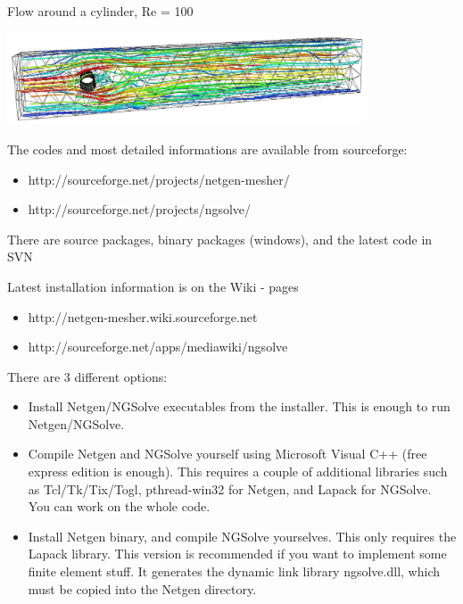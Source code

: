 \documentclass[20pt,landscape,footrule]{foils}
\newcommand\sectionname{}
\begin{document}
\vspace{2em}

Flow around a cylinder, Re = 100 \\[0em] 
%
\begin{minipage}{0.95\textwidth}
\includegraphics[width=0.8\textwidth]{cylinder3dc.jpg}
\end{minipage}



\foilhead{\color{blue}
{\bf Downloading and Installing Netgen/NGSolve  } }
\hypertarget{installing}{}
\renewcommand\sectionname{Installing Netgen/NGSolve}
The codes and most detailed informations are available from sourceforge:

\begin{itemize}
\item http://sourceforge.net/projects/netgen-mesher/
\item http://sourceforge.net/projects/ngsolve/
\end{itemize}

There are source packages, binary packages (windows), and the latest code in SVN

Latest installation information is on the Wiki - pages
\begin{itemize}
\item http://netgen-mesher.wiki.sourceforge.net
\item http://sourceforge.net/apps/mediawiki/ngsolve
\end{itemize}

\foilhead{\color{blue}
{\bf Installing Netgen/NGSolve on Windows} }

There are 3 different options:
\begin{itemize}
\item Install Netgen/NGSolve executables from the installer. 
This is enough to run Netgen/NGSolve.

\item Compile Netgen and NGSolve yourself using 
Microsoft Visual C++ (free express edition is enough). This requires a couple of
additional libraries such as Tcl/Tk/Tix/Togl, pthread-win32 for
Netgen, and Lapack for NGSolve.  You can work on the whole code.

\item Install Netgen binary, and compile NGSolve yourselves. 
This only requires the Lapack library. This version is recommended if
you want to implement some finite element stuff. It generates the
dynamic link library ngsolve.dll, which must be copied into the Netgen directory.
\end{itemize}
\end{document}
